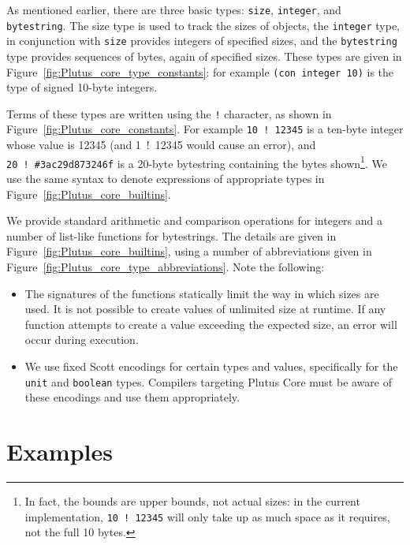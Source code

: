 \documentclass[a4paper]{article}
\begin{document}
As mentioned earlier, there are three basic types: \texttt{size},
\texttt{integer}, and \texttt{bytestring}.  The \textrm{size} type is
used to track the sizes of objects, the \texttt{integer} type, in
conjunction with \texttt{size} provides integers of specified sizes,
and the \texttt{bytestring} type provides sequences of bytes, again of
specified sizes.  These types are given in
Figure~\ref{fig:Plutus_core_type_constants}:  for example 
\texttt{(con integer 10)} is the type of signed 10-byte integers.


Terms of these types are written using the \texttt{!} character, as
shown in Figure~\ref{fig:Plutus_core_constants}.  For example
\texttt{10~!~12345} is a ten-byte integer whose value is 12345 (and
\textrm{1~!~12345} would cause an error), and \texttt{20~!~\#3ac29d873246f} 
is a 20-byte bytestring containing the bytes
shown\footnote{In fact, the bounds are upper bounds, not actual sizes:
  in the current implementation, \texttt{10~!~12345} will only take up
  as much space as it requires, not the full 10 bytes.}.  We use the
same syntax to denote expressions of appropriate types in
Figure~\ref{fig:Plutus_core_builtins}.

We provide standard arithmetic and comparison operations for integers
and a number of list-like functions for bytestrings. The details are
given in Figure~\ref{fig:Plutus_core_builtins}, using a number of
abbreviations given in Figure~\ref{fig:Plutus_core_type_abbreviations}.
Note the following:
\begin{itemize}
\item The signatures of the functions statically limit the way in
  which sizes are used.  It is not possible to create values of
  unlimited size at runtime.  If any function attempts to create a
  value exceeding the expected size, an error will occur during execution.
\item We use fixed Scott encodings for certain types and values,
  specifically for the \texttt{unit} and \texttt{boolean} types.
Compilers targeting Plutus Core must be aware of these encodings and
use them appropriately.
\end{itemize}

\newpage



\section{Examples}


\end{document}
